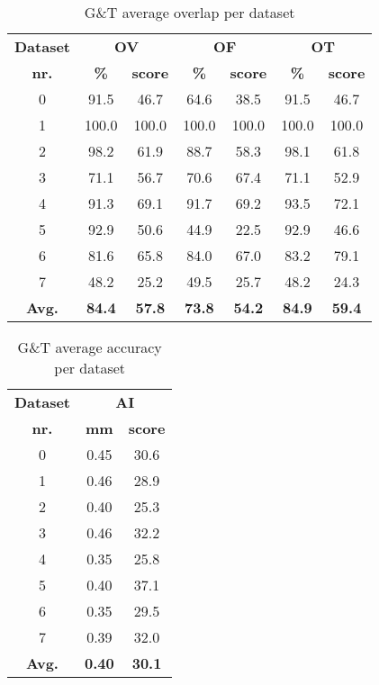 \begin{table*}
\scriptsize
\caption{G\&T average overlap per dataset}
\centering
\begin{tabular}{|c|cc|cc|cc|}
\hline
\multicolumn{1}{|c|}{\textbf{Dataset}} &\multicolumn{2}{c|}{\textbf{OV}} &\multicolumn{2}{c|}{\textbf{OF}} &\multicolumn{2}{c|}{\textbf{OT}}\\
\multicolumn{1}{|c|}{\textbf{nr.}} &\multicolumn{1}{c|}{\textbf{\%}} &\multicolumn{1}{c|}{\textbf{score}} &\multicolumn{1}{c|}{\textbf{\%}} &\multicolumn{1}{c|}{\textbf{score}} &\multicolumn{1}{c|}{\textbf{\%}} &\multicolumn{1}{c|}{\textbf{score}}\\
\hline
0&91.5&46.7&64.6&38.5&91.5&46.7\\
1&100.0&100.0&100.0&100.0&100.0&100.0\\
2&98.2&61.9&88.7&58.3&98.1&61.8\\
3&71.1&56.7&70.6&67.4&71.1&52.9\\
4&91.3&69.1&91.7&69.2&93.5&72.1\\
5&92.9&50.6&44.9&22.5&92.9&46.6\\
6&81.6&65.8&84.0&67.0&83.2&79.1\\
7&48.2&25.2&49.5&25.7&48.2&24.3\\
\hline
\textbf{Avg.}&\textbf{84.4}&\textbf{57.8}&\textbf{73.8}&\textbf{54.2}&\textbf{84.9}&\textbf{59.4}\\
\hline
\end{tabular}
\vspace{-0.3cm}
\label{tb:tb_4_4}
\normalsize
\end{table*}

\begin{table*}
\scriptsize
\caption{G\&T average accuracy per dataset}
\centering
\begin{tabular}{|c|cc|}
\hline
\multicolumn{1}{|c|}{\textbf{Dataset}} &\multicolumn{2}{c|}{\textbf{AI}}\\
\multicolumn{1}{|c|}{\textbf{nr.}} &\multicolumn{1}{c|}{\textbf{mm}} &\multicolumn{1}{c|}{\textbf{score}}\\
\hline
0&0.45&30.6\\
1&0.46&28.9\\
2&0.40&25.3\\
3&0.46&32.2\\
4&0.35&25.8\\
5&0.40&37.1\\
6&0.35&29.5\\
7&0.39&32.0\\
\hline
\textbf{Avg.}&\textbf{0.40}&\textbf{30.1}\\
\hline
\end{tabular}
\vspace{-0.3cm}
\label{tb:tb_4_5}
\normalsize
\end{table*}


